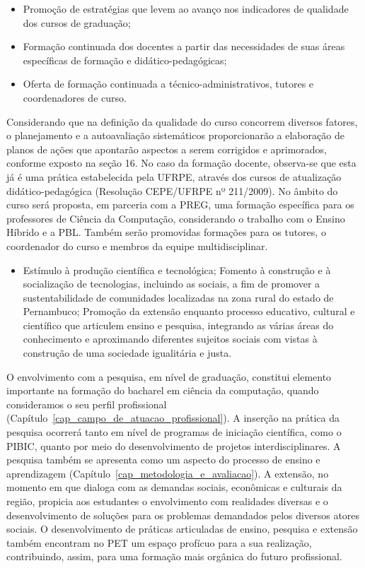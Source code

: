 \documentclass[
	12pt,				%
	openright,			%
  oneside,     %
	a4paper,			%
	chapter=TITLE,		%
	english,			%
	french,				%
	spanish,			%
	brazil				%
	]{abntex2}
\begin{document}
\begin{itemize}
	\item Promoção de estratégias que levem ao avanço nos indicadores de qualidade dos cursos de graduação;
	\item Formação continuada dos docentes a partir das necessidades de suas áreas específicas de formação e didático-pedagógicas;
	\item Oferta de formação continuada a técnico-administrativos, tutores e coordenadores de curso.
\end{itemize}

Considerando que na definição da qualidade do curso concorrem diversos fatores, o planejamento e a autoavaliação sistemáticos proporcionarão a elaboração de planos de ações que apontarão aspectos a serem corrigidos e aprimorados, conforme exposto na seção 16. No caso da formação docente, observa-se que esta já é uma prática estabelecida pela UFRPE, através dos cursos de atualização didático-pedagógica (Resolução CEPE/UFRPE nº 211/2009). No âmbito do curso será proposta, em parceria com a PREG, uma formação específica para os professores de Ciência da Computação, considerando o trabalho com o Ensino Híbrido e a PBL. Também serão promovidas formações para os tutores, o coordenador do curso e membros da equipe multidisciplinar.	 
	 	
\begin{itemize}
	\item Estímulo à produção científica e tecnológica; 
	Fomento à construção e à socialização de tecnologias, incluindo as sociais, a fim de promover a sustentabilidade de comunidades localizadas na zona rural do estado de Pernambuco; 	
	Promoção da extensão enquanto processo educativo, cultural e científico que articulem ensino e pesquisa, integrando as várias áreas do conhecimento e aproximando diferentes sujeitos sociais com vistas à construção de uma sociedade igualitária e justa.
\end{itemize}

O envolvimento com a pesquisa, em nível de graduação, constitui elemento importante na formação do bacharel em ciência da computação, quando consideramos o seu perfil profissional (Capítulo~\ref{cap_campo_de_atuacao_profissional}). A inserção na prática da pesquisa ocorrerá tanto em nível de programas de iniciação científica, como o PIBIC, quanto por meio do desenvolvimento de projetos interdisciplinares. A pesquisa também se apresenta como um aspecto do processo de ensino e aprendizagem (Capítulo~\ref{cap_metodologia_e_avaliacao}). A extensão, no momento em que dialoga com as demandas sociais, econômicas e culturais da região, propicia aos estudantes o envolvimento com realidades diversas e o desenvolvimento de soluções para os problemas demandados pelos diversos atores sociais. O desenvolvimento de práticas articuladas de ensino, pesquisa e extensão também encontram no PET um espaço profícuo para a sua realização, contribuindo, assim, para uma formação mais orgânica do futuro profissional.	 	 	
\end{document}
